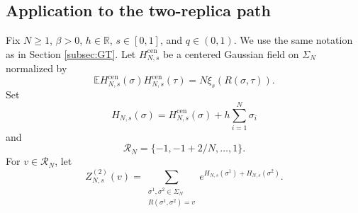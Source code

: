 \documentclass[11pt]{article}
\numberwithin{equation}{section}
\newcommand{\E}{\mathbb{E}}
\newcommand{\1}{\mathbf 1}
\begin{document}
\subsection{Application to the two-replica path}
Fix $N\geq1$, $\beta>0$, $h\in\mathbb R$, $s\in[0,1]$, and $q\in(0,1)$.
We use the same notation as in Section \ref{subsec:GT}.
Let $H_{N,s}^{\mathrm{cen}}$ be a centered Gaussian field on
$\Sigma_N$ normalized by
\begin{equation}
\E H_{N,s}^{\mathrm{cen}}(\sigma)
H_{N,s}^{\mathrm{cen}}(\tau)
=N\xi_s(R(\sigma,\tau)).
\label{eq:appendix-exact-covariance}
\end{equation}
Set
\[
H_{N,s}(\sigma)=H_{N,s}^{\mathrm{cen}}(\sigma)
+h\sum_{i=1}^N\sigma_i
\]
and
\[
\mathcal R_N=\{-1,-1+2/N,\ldots,1\}.
\]
For $v\in\mathcal R_N$, let
\begin{equation}
Z_{N,s}^{(2)}(v)=
\sum_{\substack{\sigma^1,\sigma^2\in\Sigma_N\\
R(\sigma^1,\sigma^2)=v}}
e^{H_{N,s}(\sigma^1)+H_{N,s}(\sigma^2)}.
\label{eq:appendix-constrained-partition}
\end{equation}
\end{document}
